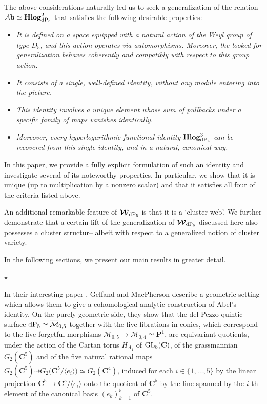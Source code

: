 \documentclass[11pt]{amsart}
\newcommand{\mk}{\medskip}
\begin{document}
\newpage
The above considerations naturally led us to seek a generalization of the relation 
${\mathcal A}{\bf b}\simeq 
{\bf Hlog}^{2}_{ {\rm dP}_5}$ 
 that satisfies the following desirable properties:
\begin{itemize}
  \item {\it It is defined on a space equipped with a natural action of the Weyl group of type $D_5$, and this action operates via automorphisms. Moreover, the looked for generalization behaves coherently and compatibly with respect to this group action.}
  \mk 
  \item {\it It consists of a single, well-defined identity, without any  module entering into the picture.}
  \mk 
  \vspace{-0.4cm}
  \item {\it This identity involves a unique element whose sum of pullbacks under a specific family of maps vanishes identically.}
  \mk 
  \item {\it Moreover, every hyperlogarithmic functional identity ${\bf Hlog}^{3}_{ {\rm dP}_4}$ can be recovered from this single identity, and in a natural, canonical way.}
\end{itemize}

In this paper, we provide a fully explicit formulation of such an identity and investigate several of its noteworthy properties. In particular, we show that it is unique (up to multiplication by a nonzero scalar) and that it satisfies all four of the criteria listed above.

An additional remarkable feature of $
\boldsymbol{\mathcal W}_{ {\rm dP}_5}$ is that it is a `cluster web'.  We further demonstrate that a certain lift of the generalization of $ \boldsymbol{\mathcal W}_{ {\rm dP}_5} $
discussed here also possesses a cluster structur-- albeit with respect to a generalized notion of cluster variety.

In the following sections, we present our main results in greater detail.
\begin{center}
\vspace{-0.3cm}
$\star$
\end{center}

In their interesting paper \cite{GM}, Gelfand and MacPherson describe  a geometric setting which allows them to give a cohomological-analytic construction of Abel's identity. On the purely geometric side,  they show that the del Pezzo quintic surface 
${\rm dP}_5\simeq \overline{\mathcal M}_{0,5}$ together with the five 
fibrations in conics, which correspond to the 
five forgetful morphisms $\overline{\mathcal M}_{0,5}\rightarrow \overline{\mathcal M}_{0,4} \simeq \mathbf P^1$,  are equivariant quotients, under the  action 
of the Cartan torus $H_{A_4}$ of ${\rm GL}_5(\mathbf C)$, 
of the grassmannian $G_2(\mathbf C^5)$ and of the five natural rational maps 
$G_2(\mathbf C^5)\dashrightarrow G_2\big(\mathbf C^5/\langle e_i\rangle\big)\simeq G_2(\mathbf C^4)$,  induced for each $i\in \{1,\ldots,5\}$ by the linear projection $\mathbf C^5\rightarrow 
\mathbf C^5/\langle e_i\rangle$ onto the quotient of  $\mathbf C^5$ by the line
spanned by the $i$-th element of the  canonical basis $(e_k)_{k=1}^5$ of $\mathbf C^5$. 
\end{document}
